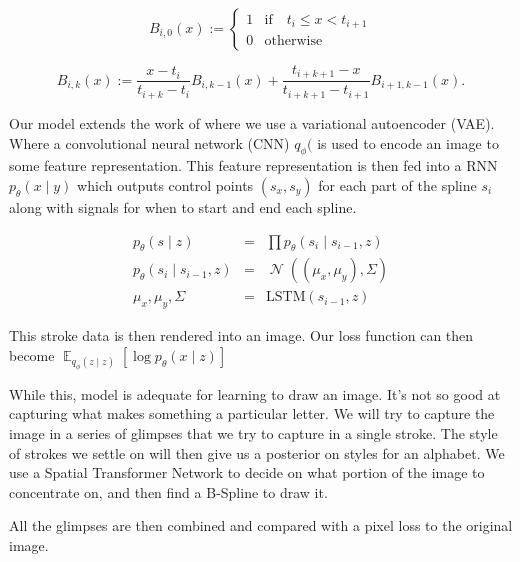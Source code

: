 \documentclass{article}
\DeclareMathOperator{\Gauss}{\mathcal N}
\DeclareMathOperator{\E}{\mathbb{E}}
\newcommand{\given}{\mid}
\begin{document}
\begin{equation}
B_{i,0}(x) := \left\{
\begin{matrix} 
1 & \mathrm{if} \quad t_i \leq x < t_{i+1} \\
0 & \mathrm{otherwise} 
\end{matrix}
\right.
\end{equation}

\begin{equation}
B_{i,k}(x) := \frac{x - t_i}{t_{i+k} - t_i} B_{i,k-1}(x) + \frac{t_{i+k+1} - x}{t_{i+k+1} - t_{i+1}} B_{i+1,k-1}(x).
\end{equation}

Our model extends the work of \citet{chen2017sketch} where we use a
variational autoencoder (VAE). Where a convolutional neural network
(CNN) $q_\phi($ is used to encode an image to some feature
representation. This feature representation is then fed into a RNN
$p_\theta(x \given y)$ which outputs control points $(s_x, s_y)$ for
each part of the spline $s_i$ along with signals for when to start and
end each spline.

\begin{eqnarray}
  p_\theta(s \given z) &=& \prod p_\theta(s_i \given s_{i-1}, z) \\
  p_\theta(s_i \given s_{i-1}, z) &=& \Gauss((\mu_x, \mu_y) , \Sigma) \\
  \mu_x, \mu_y, \Sigma &=& \text{LSTM}(s_{i-1}, z)
\end{eqnarray}

This stroke data is then rendered into an image. Our loss function can
then become $\E_{q_\phi(z \given z)}[\log p_\theta(x \given z)]$

While this, model is adequate for learning to draw an image. It's not
so good at capturing what makes something a particular letter. We will
try to capture the image in a series of glimpses that we try to
capture in a single stroke.  The style of strokes we settle on will
then give us a posterior on styles for an alphabet. We use a Spatial
Transformer Network\citep{jaderberg2015spatial} to decide on what
portion of the image to concentrate on, and then find a B-Spline to
draw it.

All the glimpses are then combined and compared with a pixel loss
to the original image.
\end{document}
